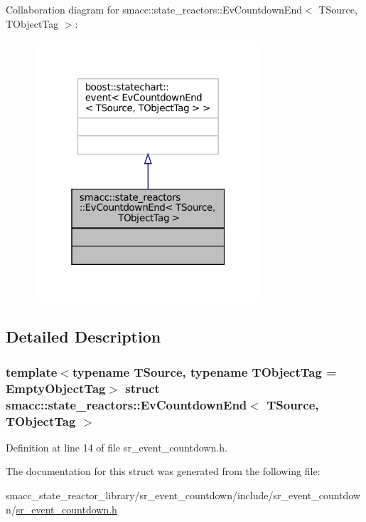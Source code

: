 Collaboration diagram for smacc\+:\+:state\+\_\+reactors\+:\+:Ev\+Countdown\+End$<$ T\+Source, T\+Object\+Tag $>$\+:
\nopagebreak
\begin{figure}[H]
\begin{center}
\leavevmode
\includegraphics[width=241pt]{structsmacc_1_1state__reactors_1_1EvCountdownEnd__coll__graph}
\end{center}
\end{figure}


\subsection{Detailed Description}
\subsubsection*{template$<$typename T\+Source, typename T\+Object\+Tag = Empty\+Object\+Tag$>$\newline
struct smacc\+::state\+\_\+reactors\+::\+Ev\+Countdown\+End$<$ T\+Source, T\+Object\+Tag $>$}



Definition at line 14 of file sr\+\_\+event\+\_\+countdown.\+h.



The documentation for this struct was generated from the following file\+:\begin{DoxyCompactItemize}
\item 
smacc\+\_\+state\+\_\+reactor\+\_\+library/sr\+\_\+event\+\_\+countdown/include/sr\+\_\+event\+\_\+countdown/\hyperlink{sr__event__countdown_8h}{sr\+\_\+event\+\_\+countdown.\+h}\end{DoxyCompactItemize}
